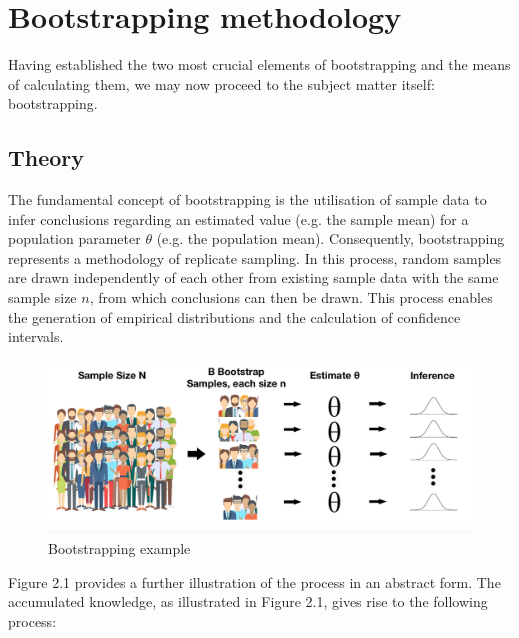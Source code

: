 \section{Bootstrapping methodology}
Having established the two most crucial elements of bootstrapping and the means of calculating them, we may now proceed to the subject matter itself: bootstrapping. 

\subsection{Theory}
The fundamental concept of bootstrapping is the utilisation of sample data to infer conclusions regarding an estimated value (e.g. the sample mean) for a population parameter \( \theta\) (e.g. the population mean). Consequently, bootstrapping represents a methodology of replicate sampling. In this process, random samples are drawn independently of each other from existing sample data with the same sample size \(n\), from which conclusions can then be drawn.
This process enables the generation of empirical distributions and the calculation of confidence intervals. 



\begin{figure}[h]
    \centering
    \includegraphics[width=\textwidth]{pictures/BootstrappingExample.png}
    \caption{Bootstrapping example}
    \label{fig:meinbild}
\end{figure}


Figure 2.1 provides a further illustration of the process in an abstract form. The accumulated knowledge, as illustrated in Figure 2.1, gives rise to the following process:

